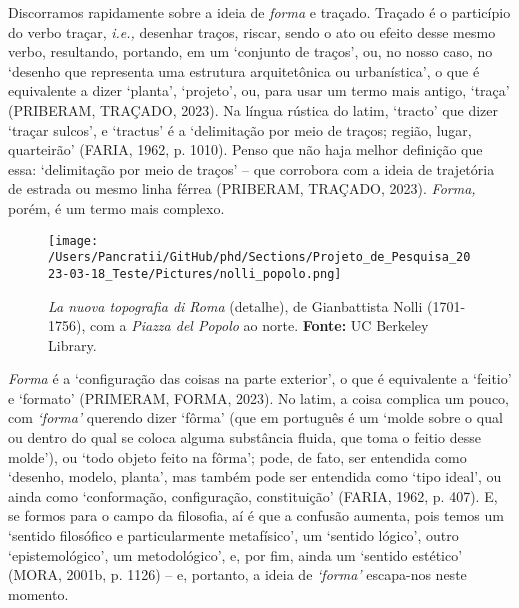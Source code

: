 \documentclass[12pt, a4paper]{book} %
\begin{document}
            Discorramos rapidamente sobre a ideia de \textit{forma} e traçado. Traçado é o particípio do verbo traçar, \textit{i.e.,} desenhar traços, riscar, sendo o ato ou efeito desse mesmo verbo, resultando, portando, em um `conjunto de traços', ou, no nosso caso, no `desenho que representa uma estrutura arquitetônica ou urbanística', o que é equivalente a dizer `planta', `projeto', ou, para usar um termo mais antigo, `traça' (PRIBERAM, TRAÇADO, 2023). Na língua rústica do latim, `tracto' que dizer `traçar sulcos', e `tractus' é a `delimitação por meio de traços; região, lugar, quarteirão' (FARIA, 1962, p. 1010). Penso que não haja melhor definição que essa: `delimitação por meio de traços' – que corrobora com a ideia de trajetória de estrada ou mesmo linha férrea (PRIBERAM, TRAÇADO, 2023). \textit{Forma,} porém, é um termo mais complexo.

            \begin{figure}
	            \centering
	            \texttt{[image: /Users/Pancratii/GitHub/phd/Sections/Projeto\_de\_Pesquisa\_2023-03-18\_Teste/Pictures/nolli\_popolo.png]}
	            \captionsetup{labelfont=bf}
	            \caption{\textit{La nuova topografia di Roma} (detalhe), de Gianbattista Nolli (1701-1756), com a \textit{Piazza del Popolo} ao norte. \textbf{Fonte:} UC Berkeley Library.}
	            \label{fig:nolli_popolo}
            \end{figure} 

            \textit{Forma} é a `configuração das coisas na parte exterior', o que é equivalente a `feitio' e `formato' (PRIMERAM, FORMA, 2023). No latim, a coisa complica um pouco, com \textit{`forma'} querendo dizer `fôrma' (que em português é um `molde sobre o qual ou dentro do qual se coloca alguma substância fluida, que toma o feitio desse molde'), ou `todo objeto feito na fôrma'; pode, de fato, ser entendida como `desenho, modelo, planta', mas também pode ser entendida como `tipo ideal', ou ainda como `conformação, configuração, constituição' (FARIA, 1962, p. 407). E, se formos para o campo da filosofia, aí é que a confusão aumenta, pois temos um `sentido filosófico e particularmente metafísico', um `sentido lógico', outro `epistemológico', um metodológico', e, por fim, ainda um `sentido estético' (MORA, 2001b, p. 1126) – e, portanto, a ideia de \textit{`forma'} escapa-nos neste momento.
\end{document}
